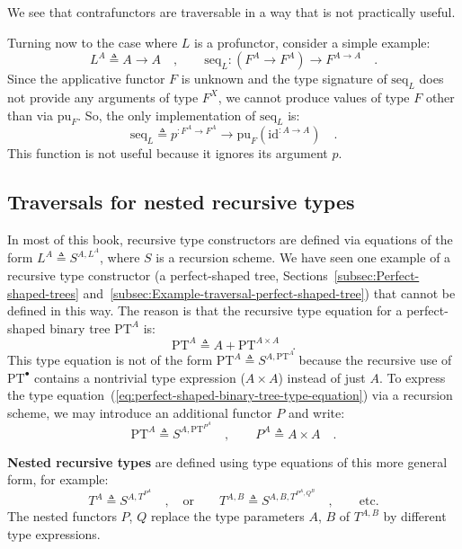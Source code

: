 We see that contrafunctors are traversable in a way that is not practically
useful.

Turning now to the case where $L$ is a profunctor, consider a simple
example:
\[
L^{A}\triangleq A\rightarrow A\quad,\quad\quad\text{seq}_{L}:(F^{A}\rightarrow F^{A})\rightarrow F^{A\rightarrow A}\quad.
\]
Since the applicative functor $F$ is unknown and the type signature
of $\text{seq}_{L}$ does not provide any arguments of type $F^{X}$,
we cannot produce values of type $F$ other than via $\text{pu}_{F}$.
So, the only implementation of $\text{seq}_{L}$ is:
\[
\text{seq}_{L}\triangleq p^{:F^{A}\rightarrow F^{A}}\rightarrow\text{pu}_{F}(\text{id}^{:A\rightarrow A})\quad.
\]
This function is not useful because it ignores its argument $p$.

\subsection{Traversals for nested recursive types}

In most of this book, recursive type constructors are defined via
equations of the form $L^{A}\triangleq S^{A,L^{A}}$, where $S$ is
a recursion scheme. We have seen one example of a recursive type constructor
(a perfect-shaped tree, Sections~\ref{subsec:Perfect-shaped-trees}
and~\ref{subsec:Example-traversal-perfect-shaped-tree}) that cannot
be defined in this way. The reason is that the recursive type equation
for a perfect-shaped binary tree $\text{PT}^{A}$
is:
\begin{equation}
\text{PT}^{A}\triangleq A+\text{PT}^{A\times A}\quad.\label{eq:perfect-shaped-binary-tree-type-equation}
\end{equation}
This type equation is not of the form $\text{PT}^{A}\triangleq S^{A,\text{PT}^{A}}$
because the recursive use of $\text{PT}^{\bullet}$ contains a nontrivial
type expression ($A\times A$) instead of just $A$. To express the
type equation~(\ref{eq:perfect-shaped-binary-tree-type-equation})
via a recursion scheme, we may introduce an additional functor $P$
and write:
\[
\text{PT}^{A}\triangleq S^{A,\text{PT}^{P^{A}}}\quad,\quad\quad P^{A}\triangleq A\times A\quad.
\]

\textbf{Nested recursive types} are
defined using type equations of this more general form, for example:
\begin{equation}
T^{A}\triangleq S^{A,T^{P^{A}}}\quad,\quad\text{or}\quad\quad T^{A,B}\triangleq S^{A,B,T^{P^{A},Q^{B}}}\quad,\quad\quad\text{etc.}\label{eq:nested-recursive-type-equations}
\end{equation}
The nested functors $P$, $Q$ replace the type parameters $A$, $B$
of $T^{A,B}$ by different type expressions. 

